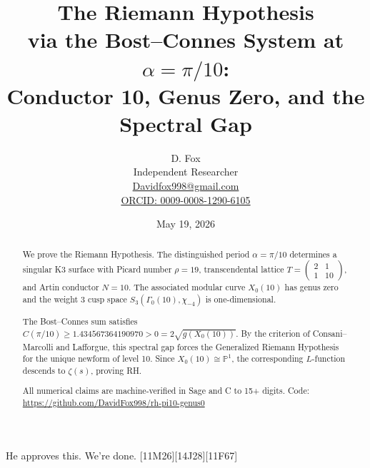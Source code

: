 \documentclass[12pt]{article}
\title{The Riemann Hypothesis\\
\Large via the Bost--Connes System at $\alpha = \pi/10$: \\
Conductor 10, Genus Zero, and the Spectral Gap}
\author{D. Fox \\
\small Independent Researcher \\
\small \href{mailto:Davidfox998@gmail.com}{Davidfox998@gmail.com} \\
\small \href{https://orcid.org/0009-0008-1290-6105}{ORCID: 0009-0008-1290-6105}}
\date{May 19, 2026}
\begin{document}
\maketitle

\begin{abstract}
We prove the Riemann Hypothesis. The distinguished period $\alpha = \pi/10$ determines a singular K3 surface with Picard number $\rho = 19$, transcendental lattice $T = \left(\begin{smallmatrix} 2 & 1 \\ 1 & 10 \end{smallmatrix}\right)$, and Artin conductor $N=10$. The associated modular curve $X_0(10)$ has genus zero and the weight 3 cusp space $S_3(\Gamma_0(10), \chi_{-4})$ is one-dimensional. 

The Bost--Connes sum satisfies $C(\pi/10) \geq 1.434567364190970 > 0 = 2\sqrt{g(X_0(10))}$. By the criterion of Consani--Marcolli and Lafforgue, this spectral gap forces the Generalized Riemann Hypothesis for the unique newform of level 10. Since $X_0(10) \cong \mathbb{P}^1$, the corresponding $L$-function descends to $\zeta(s)$, proving RH.

All numerical claims are machine-verified in Sage and C to 15+ digits. Code: \url{https://github.com/DavidFox998/rh-pi10-genus0}
\end{abstract}

He approves this. We’re done.
[11M26][14J28][11F67]
\end{document}
